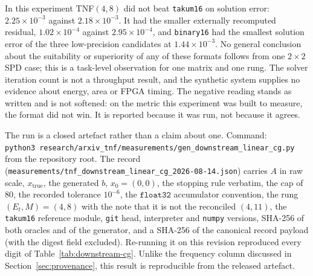 \documentclass[11pt]{article}
\theoremstyle{definition}
\begin{document}
In this experiment TNF$(4,8)$ did not beat \texttt{takum16} on solution error:
$2.25\times10^{-3}$ against $2.18\times10^{-3}$. It had the smaller externally
recomputed residual, $1.02\times10^{-4}$ against $2.95\times10^{-4}$, and
\texttt{binary16} had the smallest solution error of the three low-precision
candidates at $1.44\times10^{-3}$. No general conclusion about the suitability or
superiority of any of these formats follows from one $2\times2$ SPD case; this is a
task-level observation for one matrix and one rung. The solver iteration count is
not a throughput result, and the synthetic system supplies no evidence about
energy, area or FPGA timing. The negative reading stands as written and is not
softened: on the metric this experiment was built to measure, the format did not
win. It is reported because it was run, not because it agrees.

\begin{sloppypar}
The run is a closed artefact rather than a claim about one. Command:
\texttt{python3}\ \texttt{research/}\allowbreak\texttt{arxiv\_tnf/}\allowbreak\texttt{measurements/}\allowbreak\texttt{gen\_downstream\_}\allowbreak\texttt{linear\_cg.py}
from the repository root. The record
(\texttt{measurements/}\allowbreak\texttt{tnf\_downstream\_}\allowbreak\texttt{linear\_cg\_}\allowbreak\texttt{2026-08-14.json}) carries $A$ in
raw scale, $x_{\text{true}}$, the generated $b$, $x_0 = (0,0)$, the stopping rule
verbatim, the cap of $80$, the recorded tolerance $10^{-6}$, the $\texttt{float32}$
accumulator convention, the rung $(E_t,M)=(4,8)$ with the note that it is not the
reconciled $(4,11)$, the \texttt{takum16} reference module, \texttt{git} head,
interpreter and \texttt{numpy} versions, SHA-256 of both oracles and of the
generator, and a SHA-256 of the canonical record payload (with the digest field
excluded). Re-running it on this revision reproduced
every digit of Table~\ref{tab:downstream-cg}. Unlike the frequency column discussed
in Section~\ref{sec:provenance}, this result is reproducible from the released
artefact.
\end{sloppypar}
\end{document}
